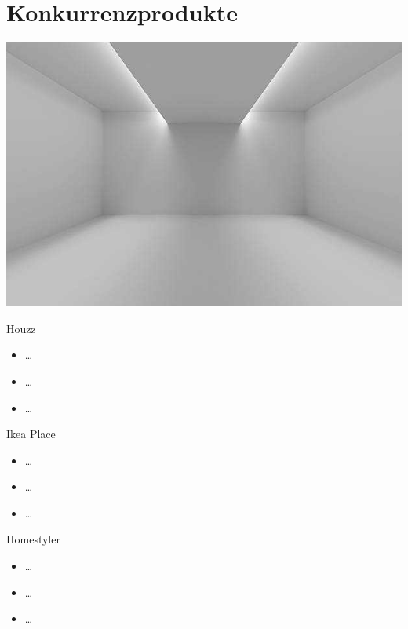 \documentclass[presentation,bigger,aspectratio=169]{beamer}
\begin{document}
\section{Konkurrenzprodukte}
\label{sec:org3677a03}
\begin{frame}[label={sec:org1f4757f}]{\MakeUppercase{\insertsection}}
\begin{center}
\begin{center}
\includegraphics[height=0.77\textheight]{./img/m1_praes_empty_01.jpg}
\label{fig:m1_praes_empty_01}
\end{center}
\end{center}
\end{frame}
\begin{frame}[label={sec:org0535c2f}]{Houzz}
\begin{itemize}
\item \ldots{}
\item \ldots{}
\item \ldots{}
\end{itemize}
\end{frame}
\begin{frame}[label={sec:orgaca9f7e}]{Ikea Place}
\begin{itemize}
\item \ldots{}
\item \ldots{}
\item \ldots{}
\end{itemize}
\end{frame}
\begin{frame}[label={sec:orga14a701}]{Homestyler}
\begin{itemize}
\item \ldots{}
\item \ldots{}
\item \ldots{}
\end{itemize}
\end{frame}
\end{document}
